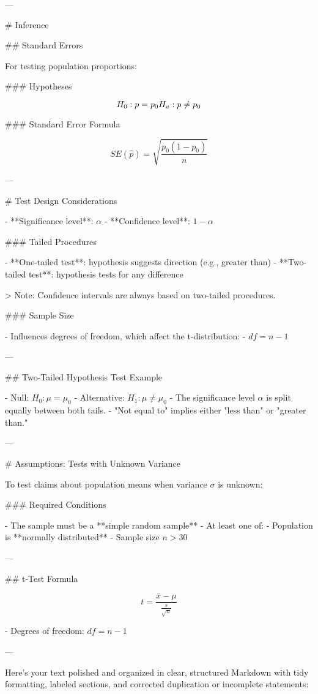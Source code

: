 ---

# Inference

## Standard Errors

For testing population proportions:

### Hypotheses

\[
H_0: p = p_0 \\
H_a: p \neq p_0
\]

### Standard Error Formula

\[
SE(\hat{p}) = \sqrt{ \frac{p_0(1 - p_0)}{n} }
\]

---

# Test Design Considerations

- **Significance level**: \( \alpha \)
- **Confidence level**: \( 1 - \alpha \)

### Tailed Procedures

- **One-tailed test**: hypothesis suggests direction (e.g., greater than)
- **Two-tailed test**: hypothesis tests for any difference

> Note: Confidence intervals are always based on two-tailed procedures.

### Sample Size

- Influences degrees of freedom, which affect the t-distribution:
  - \( df = n - 1 \)

---

## Two-Tailed Hypothesis Test Example

- Null: \( H_0: \mu = \mu_0 \)
- Alternative: \( H_1: \mu \neq \mu_0 \)
- The significance level \( \alpha \) is split equally between both tails.
- "Not equal to" implies either "less than" or "greater than."

---

# Assumptions: Tests with Unknown Variance

To test claims about population means when variance \( \sigma \) is unknown:

### Required Conditions

- The sample must be a **simple random sample**
- At least one of:
  - Population is **normally distributed**
  - Sample size \( n > 30 \)

---

## t-Test Formula

\[
t = \frac{\bar{x} - \mu}{\frac{s}{\sqrt{n}}}
\]

- Degrees of freedom: \( df = n - 1 \)

---

Here’s your text polished and organized in clear, structured Markdown with tidy formatting, labeled sections, and corrected duplication or incomplete statements:

